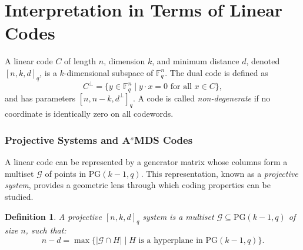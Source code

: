 \documentclass[letterpaper, 12pt]{article}
\newtheorem{definition}{Definition}%
\newcommand{\F}{\mathbb{F}}
\newcommand{\K}{\mathcal{K}}
\newcommand{\G}{\mathcal{G}}
\begin{document}
%	
%	


\section*{Interpretation in Terms of Linear Codes}

A linear code \( C \) of length \( n \), dimension \( k \), and minimum distance \( d \), denoted \([n, k, d]_q\), is a \( k \)-dimensional subspace of \( \F_q^n \). The dual code is defined as
\[
C^\perp = \{ y \in \F_q^n \mid y \cdot x = 0 \text{ for all } x \in C \},
\]
and has parameters \([n, n-k, d^\perp]_q\). A code is called \emph{non-degenerate} if no coordinate is identically zero on all codewords.

\subsubsection*{Projective Systems and A$^s$MDS Codes}

A linear code can be represented by a generator matrix whose columns form a multiset \( \G \) of points in PG\((k - 1, q)\). This representation, known as a \emph{projective system}, provides a geometric lens through which coding properties can be studied.

\begin{definition}
	A \emph{projective \([n, k, d]_q\) system} is a multiset \( \G \subseteq \text{PG}(k - 1, q) \) of size \( n \), such that:
	\[
	n - d = \max \{ |\G \cap H| \mid H \text{ is a hyperplane in PG}(k - 1, q) \}.
	\]
\end{definition}
\end{document}
